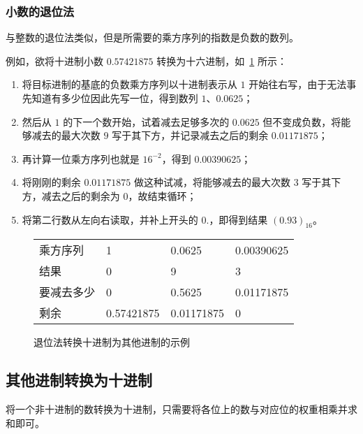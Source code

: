         \subsubsection{小数的退位法}\label{subsubsec:NumberSystemBasics/positional-notation-conversion/from-decimal/fractal-descending-subtraction}

            与整数的退位法类似，但是所需要的乘方序列的指数是负数的数列。

            例如，欲将十进制小数 $0.57421875$ 转换为十六进制，如~\ref{fig:NumberSystemBasics/positional-notation-conversion/from-decimal/fractal-descending-subtraction} 所示：

            \begin{enumerate}
                \item 将目标进制的基底的负数乘方序列以十进制表示从 $1$ 开始往右写，由于无法事先知道有多少位因此先写一位，得到数列 $1$、$0.0625$；
                \item 然后从 $1$ 的下一个数开始，试着减去足够多次的 $0.0625$ 但不变成负数，将能够减去的最大次数 $9$ 写于其下方，并记录减去之后的剩余 $0.01171875$；
                \item 再计算一位乘方序列也就是 $16^{-2}$，得到 $0.00390625$；
                \item 将刚刚的剩余 $0.01171875$ 做这种试减，将能够减去的最大次数 $3$ 写于其下方，减去之后的剩余为 $0$，故结束循环；
                \item 将第二行数从左向右读取，并补上开头的 $0.$，即得到结果 $(0.93)_{16}$。
            \end{enumerate}

            \begin{figure}
                \centering
                \begin{tabular}{llll}
                    乘方序列   & 1          & 0.0625     & 0.00390625 \\
                    结果       & 0          &          9 &          3 \\ \hline
                    要减去多少 & 0          & 0.5625     & 0.01171875 \\
                    剩余       & 0.57421875 & 0.01171875 & 0
                \end{tabular}
                \caption{退位法转换十进制为其他进制的示例}
                \label{fig:NumberSystemBasics/positional-notation-conversion/from-decimal/fractal-descending-subtraction}
            \end{figure}
    \subsection{其他进制转换为十进制}\label{subsec:NumberSystemBasics/positional-notation-conversion/to-decimal}
        将一个非十进制的数转换为十进制，只需要将各位上的数与对应位的权重相乘并求和即可。

